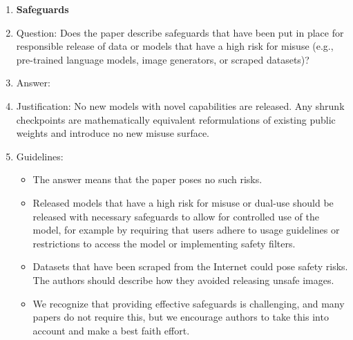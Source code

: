 \begin{enumerate}
\item {\bf Safeguards}
    \item[] Question: Does the paper describe safeguards that have been put in place for responsible release of data or models that have a high risk for misuse (e.g., pre-trained language models, image generators, or scraped datasets)?
    \item[] Answer: \answerNA{} %
    \item[] Justification: No new models with novel capabilities are released. Any shrunk checkpoints are mathematically equivalent reformulations of existing public weights and introduce no new misuse surface.
    \item[] Guidelines:
    \begin{itemize}
        \item The answer \answerNA{} means that the paper poses no such risks.
        \item Released models that have a high risk for misuse or dual-use should be released with necessary safeguards to allow for controlled use of the model, for example by requiring that users adhere to usage guidelines or restrictions to access the model or implementing safety filters.
        \item Datasets that have been scraped from the Internet could pose safety risks. The authors should describe how they avoided releasing unsafe images.
        \item We recognize that providing effective safeguards is challenging, and many papers do not require this, but we encourage authors to take this into account and make a best faith effort.
    \end{itemize}


\end{enumerate}

